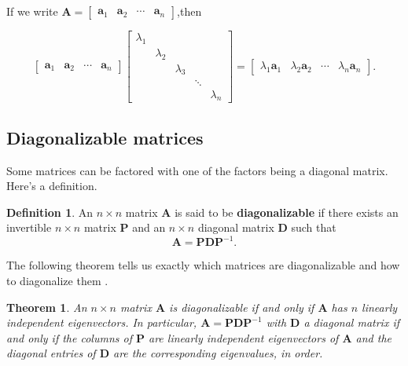 \documentclass[
]{book}
\newtheorem{theorem}{Theorem}[chapter]
\theoremstyle{definition}
\newtheorem{definition}{Definition}[chapter]
\theoremstyle{definition}
\theoremstyle{definition}
\theoremstyle{definition}
\theoremstyle{remark}
\begin{document}
If we write \(\mathbf{A}=\begin{bmatrix}\mathbf{a}_1 & \mathbf{a}_2 & \cdots & \mathbf{a}_n\end{bmatrix}\),then

\[\begin{bmatrix}\mathbf{a}_1 & \mathbf{a}_2 & \cdots & \mathbf{a}_n\end{bmatrix}\begin{bmatrix}\lambda_1 &  &  &  & \\ & \lambda_2 &&&\\ & & \lambda_3 & &\\ &&&\ddots &\\&&&& \lambda_n\end{bmatrix}=\begin{bmatrix}\lambda_1\mathbf{a}_1 & \lambda_2\mathbf{a}_2 & \cdots & \lambda_n\mathbf{a}_n\end{bmatrix}.\]

\subsection*{Diagonalizable matrices}\label{diagonalizable-matrices}

Some matrices can be factored with one of the factors being a diagonal matrix. Here's a definition.

\begin{defbox}

\begin{definition}
An \(n\times n\) matrix \(\mathbf{A}\) is said to be \textbf{diagonalizable} if there exists an invertible \(n\times n\) matrix \(\mathbf{P}\) and an \(n\times n\) diagonal matrix \(\mathbf{D}\) such that
\[\mathbf{A}=\mathbf{P}\mathbf{D}\mathbf{P}^{-1}.\]
\end{definition}

\end{defbox}

The following theorem tells us exactly which matrices are diagonalizable and how to diagonalize them \autocite{LLM}.

\begin{theorembox}

\begin{theorem}
An \(n\times n\) matrix \(\mathbf{A}\) is diagonalizable if and only if \(\mathbf{A}\) has \(n\) linearly independent eigenvectors. In particular, \(\mathbf{A}=\mathbf{P}\mathbf{D}\mathbf{P}^{-1}\) with \(\mathbf{D}\) a diagonal matrix if and only if the columns of \(\mathbf{P}\) are linearly independent eigenvectors of \(\mathbf{A}\) and the diagonal entries of \(\mathbf{D}\) are the corresponding eigenvalues, in order.
\end{theorem}

\end{theorembox}
\end{document}
